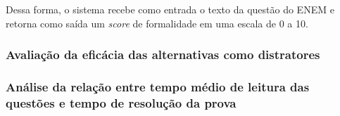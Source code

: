 \documentclass[a4paper,10pt, twocolumn]{article}
\begin{document}
Dessa forma, o sistema recebe como entrada o texto da questão do ENEM e retorna como saída um \textit{score} de formalidade em uma escala de 0 a 10.
\subsubsection{Avaliação da eficácia das alternativas como distratores}


\subsubsection{Análise da relação entre tempo médio de leitura das questões e tempo de resolução da prova}
\end{document}
